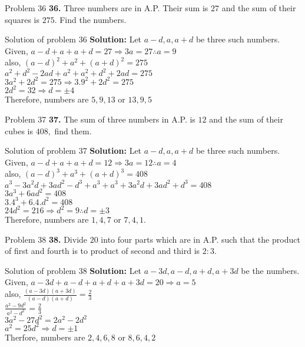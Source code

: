 \documentclass[aspectratio=1610,8pt]{beamer}
\begin{document}
\begin{frame}{Problem 36}
  \textbf{36.} Three numbers are in A.P. Their sum is $27$ and the sum of their
  squares is $275.$ Find the numbers.
\end{frame}
\begin{frame}{Solution of problem 36}
  \textbf{Solution:} Let $a - d, a , a + d$ be three such numbers.\\
  Given, $a - d + a + a + d = 27 \Rightarrow 3a = 27 \therefore a = 9$\\
  also, $(a - d)^2 + a^2 + (a + d)^2 = 275$\\
  $a^2 + d^2 - 2ad + a^2 + a^2 + d^2 + 2ad = 275$\\
  $3a^2 + 2d^2 = 275 \Rightarrow 3.9^2 + 2d^2 = 275$\\
  $2d^2 = 32 \Rightarrow d = \pm 4$\\
  Therefore, numbers are $5, 9, 13$ or $13, 9, 5$
\end{frame}
\begin{frame}{Problem 37}
  \textbf{37.} The sum of three numbers in A.P. is $12$ and the sum of their
  cubes is $408,$ find them.
\end{frame}
\begin{frame}{Solution of problem 37}
  \textbf{Solution:} Let $a - d, a , a + d$ be three such numbers.\\
  Given, $a - d + a + a + d = 12 \Rightarrow 3a = 12 \therefore a = 4$\\
  also, $(a - d)^3 + a^3 + (a + d)^3 = 408$\\
  $a^3 - 3a^2d + 3ad^2 - d^3 + a^3 + a^3 + 3a^2d + 3ad^2 + d^3 = 408$\\
  $3a^3 + 6ad^2 = 408$\\
  $3.4^3 + 6.4.d^2 = 408$\\
  $24d^2 = 216 \Rightarrow d^2 = 9 \therefore d = \pm 3$\\
  Therefore, numbers are $1, 4, 7$ or $7, 4, 1$.
\end{frame}
\begin{frame}{Problem 38}
  \textbf{38.} Divide $20$ into four parts which are in A.P. such that the
  product of first and fourth is to product of second and third is $2:3.$
\end{frame}
\begin{frame}{Solution of problem 38}
  \textbf{Solution:} Let $a - 3d, a - d, a + d, a + 3d$ be the numbers.\\
  Given, $a - 3d + a - d + a + d + a + 3d = 20 \Rightarrow a = 5$\\
  also, $\frac{(a - 3d)(a + 3d)}{(a - d)(a + d)} = \frac{2}{3}$\\
  $\frac{a^2 - 9d^2}{a^2 - d^2} = \frac{2}{3}$\\
  $3a^2 - 27d^2 = 2a^2 - 2d^2$\\
  $a^2 = 25d^2 \Rightarrow d = \pm 1$\\
  Therfore, numbers are $2, 4, 6, 8$ or $8, 6, 4, 2$
\end{frame}
\end{document}
